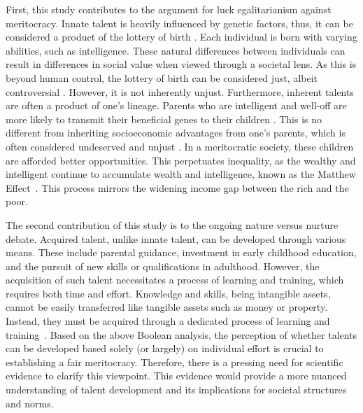 First, this study contributes to the argument for luck egalitarianism against meritocracy. Innate talent is heavily influenced by genetic factors, thus, it can be considered a product of the lottery of birth \citep{mijs2022earning}. Each individual is born with varying abilities, such as intelligence. These natural differences between individuals can result in differences in social value when viewed through a societal lens. As this is beyond human control, the lottery of birth can be considered just, albeit controversial \citep{aas2016natural}. However, it is not inherently unjust. Furthermore, inherent talents are often a product of one’s lineage. Parents who are intelligent and well-off are more likely to transmit their beneficial genes to their children \citep{mijs2022earning}. This is no different from inheriting socioeconomic advantages from one’s parents, which is often considered undeserved and unjust \citep{rowlingson2011deserving}. In a meritocratic society, these children are afforded better opportunities. This perpetuates inequality, as the wealthy and intelligent continue to accumulate wealth and intelligence, known as the Matthew Effect~\citep{bask2015cumulative}. This process mirrors the widening income gap between the rich and the poor.

The second contribution of this study is to the ongoing nature versus nurture debate. Acquired talent, unlike innate talent, can be developed through various means. These include parental guidance, investment in early childhood education, and the pursuit of new skills or qualifications in adulthood. However, the acquisition of such talent necessitates a process of learning and training, which requires both time and effort. Knowledge and skills, being intangible assets, cannot be easily transferred like tangible assets such as money or property. Instead, they must be acquired through a dedicated process of learning and training~\citep{meyers2013talent}. Based on the above Boolean analysis, the perception of whether talents can be developed based solely (or largely) on individual effort is crucial to establishing a fair meritocracy. Therefore, there is a pressing need for scientific evidence to clarify this viewpoint. This evidence would provide a more nuanced understanding of talent development and its implications for societal structures and norms.

